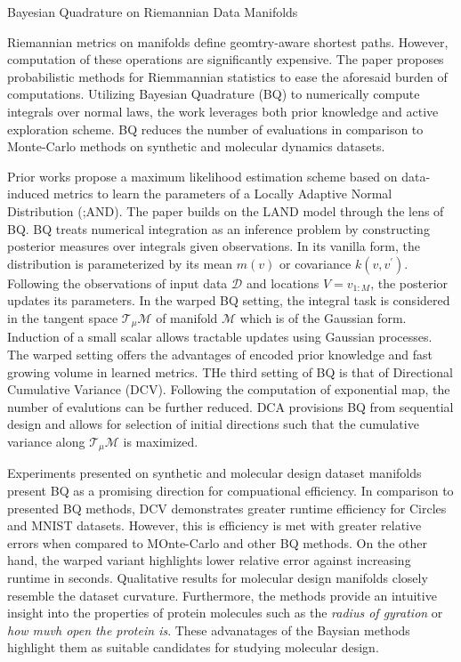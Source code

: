 \documentclass[12pt,letterpaper]{article}
\begin{document}
\begin{center}
  \large{Bayesian Quadrature on Riemannian Data Manifolds}
\end{center}

Riemannian metrics on manifolds define geomtry-aware shortest paths. However, computation of these operations are significantly expensive. The paper proposes probabilistic methods for Riemmannian statistics to ease the aforesaid burden of computations. Utilizing Bayesian Quadrature (BQ) to numerically compute integrals over normal laws, the work leverages both prior knowledge and active exploration scheme. BQ reduces the number of evaluations in comparison to Monte-Carlo methods on synthetic and molecular dynamics datasets.

Prior works propose a maximum likelihood estimation scheme based on data-induced metrics to learn the parameters of a Locally Adaptive Normal Distribution (;AND). The paper builds on the LAND model through the lens of BQ. BQ treats numerical integration as an inference problem by constructing posterior measures over integrals given observations. In its vanilla form, the distribution is parameterized by its mean $m(v)$ or covariance $k(v,v^{\prime})$. Following the observations of input data $\mathcal{D}$ and locations $V=v_{1:M}$, the posterior updates its parameters. In the warped BQ setting, the integral task is considered in the tangent space $\mathcal{T}_{\mu}\mathcal{M}$ of manifold $\mathcal{M}$ which is of the Gaussian form. Induction of a small scalar allows tractable updates using Gaussian processes. The warped setting offers the advantages of encoded prior knowledge and fast growing volume in learned metrics. THe third setting of BQ is that of Directional Cumulative Variance (DCV). Following the computation of exponential map, the number of evalutions can be further reduced. DCA provisions BQ from sequential design and allows for selection of initial directions such that the cumulative variance along $\mathcal{T}_{\mu}\mathcal{M}$ is maximized. 

Experiments presented on synthetic and molecular design dataset manifolds present BQ as a promising direction for compuational efficiency. In comparison to presented BQ methods, DCV demonstrates greater runtime efficiency for Circles and MNIST datasets. However, this is efficiency is met with greater relative errors when compared to MOnte-Carlo and other BQ methods. On the other hand, the warped variant highlights lower relative error against increasing runtime in seconds. Qualitative results for molecular design manifolds closely resemble the dataset curvature. Furthermore, the methods provide an intuitive insight into the properties of protein molecules such as the \textit{radius of gyration} or \textit{how muvh open the protein is}. These advanatages of the Baysian methods highlight them as suitable candidates for studying molecular design. 
\end{document}
